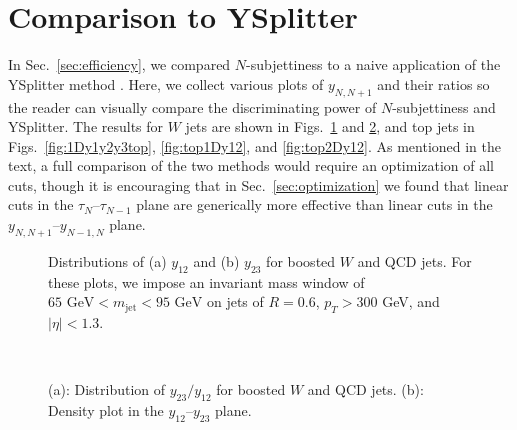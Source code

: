 \documentclass{JHEP3}
\newcommand{\vsh}{\vspace{-.5cm}}
\DeclareRobustCommand{\Sec}[1]{Sec.~\ref{#1}}
\begin{document}
\clearpage

\section{Comparison to YSplitter}
\label{app:ysplitter}

In \Sec{sec:efficiency}, we compared $N$-subjettiness to a naive application of the YSplitter method \cite{Butterworth:2002tt,YSplitter,Brooijmans:2008}.  Here, we collect various plots of $y_{N,N+1}$ and their ratios so the reader can visually compare the discriminating power of  $N$-subjettiness and YSplitter. The results for $W$ jets are shown in Figs.~\ref{fig:1Dy1y2y3w} and \ref{fig:W2Dy12}, and top jets in Figs.~\ref{fig:1Dy1y2y3top}, \ref{fig:top1Dy12}, and \ref{fig:top2Dy12}.  As mentioned in the text, a full comparison of the two methods would require an optimization of all cuts, though it is encouraging that in \Sec{sec:optimization} we found that linear cuts in the $\tau_N$--$\tau_{N-1}$ plane are generically more effective than linear cuts in the $y_{N,N+1}$--$y_{N-1,N}$ plane.

\begin{figure}[tp]
  \begin{center}
  \end{center}
  \vsh
\caption{Distributions of (a) $y_{12}$ and (b) $y_{23}$ for boosted $W$ and QCD jets.  For these plots, we impose an invariant mass window of $65 \text{ GeV} < m_{\text{jet}} < 95 \text{ GeV}$ on jets of $R = 0.6$, $p_T > 300$ GeV, and $|\eta| < 1.3$.}
  \label{fig:1Dy1y2y3w}
\end{figure}

\begin{figure}[tp]
  \begin{center}
       \\
  \end{center}
  \vsh
  \caption{(a): Distribution of $y_{23}/y_{12}$ for boosted $W$ and QCD jets.  (b): Density plot in the $y_{12}$--$y_{23}$ plane.}
  \label{fig:W2Dy12}
\end{figure}
\end{document}
